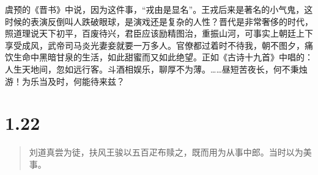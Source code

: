 \documentclass[]{book}
\begin{document}
虞预的《晋书》中说，因为这件事，``戎由是显名''。王戎后来是著名的小气鬼，这时候的表演反倒叫人跌破眼球，是演戏还是复杂的人性？晋代是非常奢侈的时代，照道理说天下初平，百废待兴，君臣应该励精图治，重振山河，可事实上朝廷上下享受成风，武帝司马炎光妻妾就要一万多人。官僚都过着时不待我，朝不图夕，痛饮生命中黑暗甘泉的生活，如此甜蜜而又如此绝望。正如《古诗十九首》中唱的：人生天地间，忽如远行客。斗酒相娱乐，聊厚不为薄。\ldots{}\ldots{}昼短苦夜长，何不秉烛游！为乐当及时，何能待来兹？

\section{1.22}\label{section-21}

\begin{quote}
刘道真尝为徒，扶风王骏以五百疋布赎之，既而用为从事中郎。当时以为美事。
\end{quote}
\end{document}
